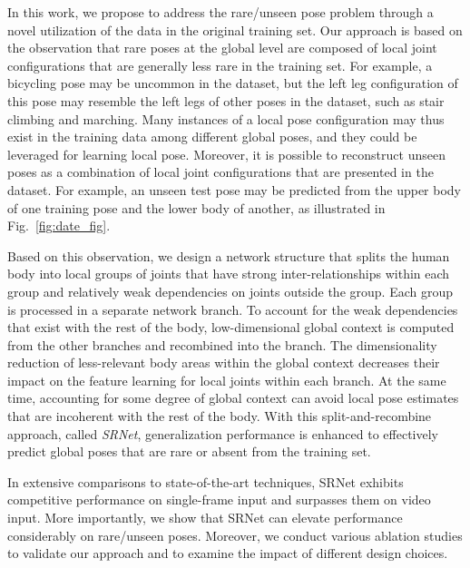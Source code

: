 \documentclass[runningheads]{llncs}
\begin{document}
In this work, we propose to address the rare/unseen pose problem through a novel utilization of the data in the original training set. Our approach is based on the observation that rare poses at the global level are composed of local joint configurations that are generally less rare in the training set. For example, a bicycling pose may be uncommon in the dataset, but the left leg configuration of this pose may resemble the left legs of other poses in the dataset, such as stair climbing and marching. Many instances of a local pose configuration may thus exist in the training data among different global poses, and they could be leveraged for learning local pose. Moreover, it is possible to reconstruct unseen poses as a combination of local joint configurations that are presented in the dataset. For example, an unseen test pose may be predicted from the upper body of one training pose and the lower body of another, as illustrated in Fig.~\ref{fig:date_fig}. 


Based on this observation, we design a network structure that splits the human body into local groups of joints that have strong inter-relationships within each group and relatively weak dependencies on joints outside the group. Each group is processed in a separate network branch. To account for the weak dependencies that exist with the rest of the body, low-dimensional global context is computed from the other branches and recombined into the branch. The dimensionality reduction of less-relevant body areas within the global context decreases their impact on the feature learning for local joints within each branch. At the same time, accounting for some degree of global context can avoid local pose estimates that are incoherent with the rest of the body. With this split-and-recombine approach, called {\em SRNet}, generalization performance is enhanced to effectively predict global poses that are rare or absent from the training set. 



In extensive comparisons to state-of-the-art techniques, SRNet exhibits competitive performance on single-frame input and surpasses them on video input. More importantly, we show that SRNet can elevate performance considerably on rare/unseen poses. Moreover, we conduct various ablation studies to validate our approach and to examine the impact of different design choices.
\end{document}
